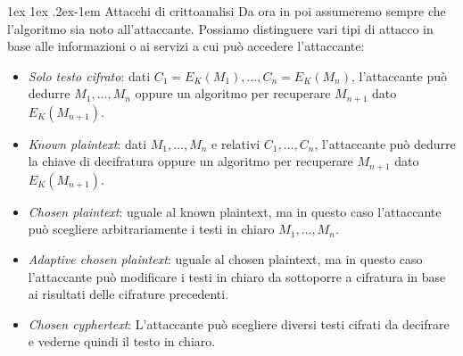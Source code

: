 \documentclass[a4paper, 11pt, notitlepage, fleqn]{report}
\makeatletter
\renewcommand{\paragraph}{%
	\@startsection{paragraph}{4}%
	{\z@}{1ex \@plus 1ex \@minus .2ex}{-1em}%
	{\normalfont\normalsize\bfseries}%
}
\makeatother
\begin{document}
\paragraph{Attacchi di crittoanalisi}
Da ora in poi assumeremo sempre che l'algoritmo sia noto all'attaccante. Possiamo distinguere vari tipi di attacco in base alle informazioni o ai servizi a cui può accedere l'attaccante:
\begin{itemize}
	\item \emph{Solo testo cifrato}: dati $C_1 = E_K(M_1), \dots, C_n = E_K(M_n)$, l'attaccante può dedurre $M_1, \dots, M_n$ oppure un algoritmo per recuperare $M_{n+1}$ dato $E_K(M_{n+1})$.
	\item \emph{Known plaintext}: dati $M_1, \dots, M_n$ e relativi $C_1, \dots, C_n$, l'attaccante può dedurre la chiave di decifratura oppure un algoritmo per recuperare $M_{n+1}$ dato $E_K(M_{n+1})$.
	\item \emph{Chosen plaintext}: uguale al known plaintext, ma in questo caso l'attaccante può scegliere arbitrariamente i testi in chiaro $M_1, \dots, M_n$.
	\item \emph{Adaptive chosen plaintext}: uguale al chosen plaintext, ma in questo caso l'attaccante può modificare i testi in chiaro da sottoporre a cifratura in base ai risultati delle cifrature precedenti.
	\item \emph{Chosen cyphertext}: L'attaccante può scegliere diversi testi cifrati da decifrare e vederne quindi il testo in chiaro.
\end{itemize}
\end{document}
